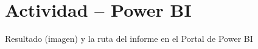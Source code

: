 \section{Actividad – Power BI} 
Resultado (imagen) y la ruta del informe en el Portal de Power BI 

